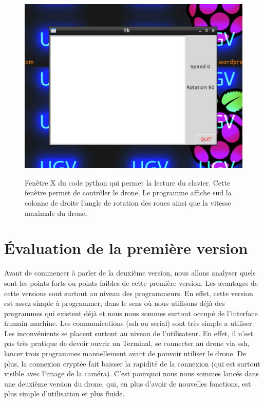 \documentclass[a4paper,11pt]{report}
\begin{document}
{\begin{center}
\begin{figure}[!h]
\includegraphics[scale=1]{python-environnement}\label{python environnement}
\caption[Interface graphique Python]{Fenêtre X du code python qui permet la lecture du clavier. Cette fenêtre permet de contrôler le drone. Le programme affiche sud la colonne de droite l'angle de rotation des roues ainsi que la vitesse maximale du drone.}
\end{figure}
\end{center}


\section{Évaluation de la première version}

Avant de commencer à parler de la deuxième version, nous allons analyser quels sont les points forts ou points faibles de cette première version. Les avantages de cette versions sont surtout au niveau des programmeurs. En effet, cette version est assez simple à programmer, dans le sens où nous utilisons déjà des programmes qui existent déjà et nous nous sommes surtout occupé de l'interface humain machine. Les communications (ssh ou serial) sont très simple a utiliser. Les inconvénients se placent surtout au niveau de l'utilisateur. En effet, il n'est pas très pratique de devoir ouvrir un Terminal, se connecter au drone via ssh, lancer trois programmes manuellement avant de pouvoir utiliser le drone. De plus, la connexion cryptée fait baisser la rapidité de la connexion (qui est surtout visible avec l'image de la caméra). C'est pourquoi nous nous sommes lancés dans une deuxième version du drone, qui, en plus d'avoir de nouvelles fonctions, est plus simple d'utilisation et plus fluide. 

}
\end{document}
